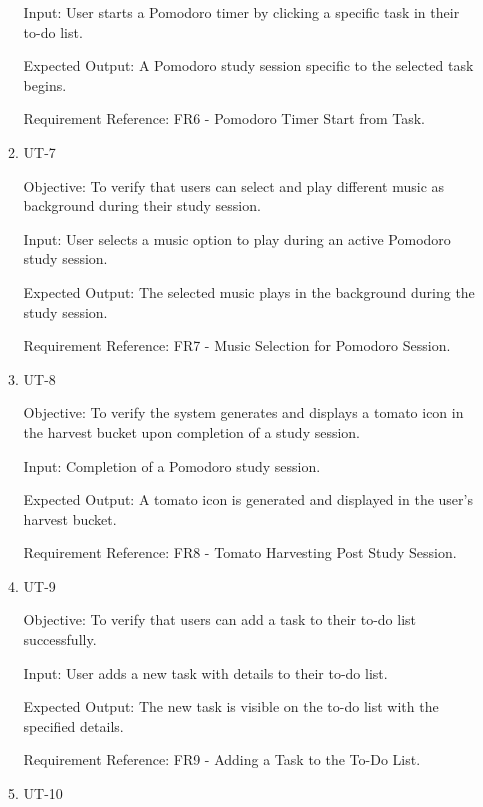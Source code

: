 \documentclass[12pt, titlepage]{article}
\begin{document}
\begin{enumerate}
\begin{enumerate}
        Input: User starts a Pomodoro timer by clicking a specific task in their to-do list.
        
        Expected Output: A Pomodoro study session specific to the selected task begins.
        
        Requirement Reference: FR6 - Pomodoro Timer Start from Task.
        
    \item{UT-7\\}\label{UT-7}
    
        Objective: To verify that users can select and play different music as background during their study session.
        
        Input: User selects a music option to play during an active Pomodoro study session.
        
        Expected Output: The selected music plays in the background during the study session.
        
        Requirement Reference: FR7 - Music Selection for Pomodoro Session.
        
    \item{UT-8\\}\label{UT-8}
    
        Objective: To verify the system generates and displays a tomato icon in the harvest bucket upon completion of a study session.
        
        Input: Completion of a Pomodoro study session.
        
        Expected Output: A tomato icon is generated and displayed in the user's harvest bucket.
        
        Requirement Reference: FR8 - Tomato Harvesting Post Study Session.
        
    \item{UT-9\\}\label{UT-9}
    
        Objective: To verify that users can add a task to their to-do list successfully.
        
        Input: User adds a new task with details to their to-do list.
        
        Expected Output: The new task is visible on the to-do list with the specified details.
        
        Requirement Reference: FR9 - Adding a Task to the To-Do List.
        
    \item{UT-10\\}\label{UT-10}
    

\end{enumerate}
\end{enumerate}
\end{document}
